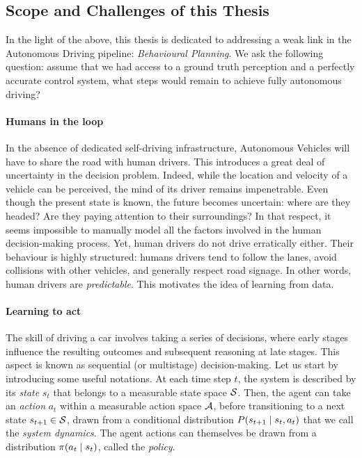 \subsection{Scope and Challenges of this Thesis}
\label{sec:scopes-and-challenges}

In the light of the above, this thesis is dedicated to addressing a weak link in the Autonomous Driving pipeline: \emph{Behavioural Planning}.  We ask the following question: assume that we had access to a ground truth perception and a perfectly accurate control system, what steps would remain to achieve fully autonomous driving?


\paragraph{Humans in the loop}

In the absence of dedicated self-driving infrastructure, Autonomous Vehicles will have to share the road with human drivers. This introduces a great deal of uncertainty in the decision problem. Indeed, while the location and velocity of a vehicle can be perceived, the mind of its driver remains impenetrable. Even though the present state is known, the future becomes uncertain: where are they headed? Are they paying attention to their surroundings? In that respect, it seems impossible to manually model all the factors involved in the human decision-making process. Yet, human drivers do not drive erratically either. Their behaviour is highly structured: humans drivers tend to follow the lanes, avoid collisions with other vehicles, and generally respect road signage. In other words, human drivers are \emph{predictable}. This motivates the idea of learning from data.%

\paragraph{Learning to act}

The skill of driving a car involves taking a series of decisions, where early stages influence the resulting outcomes and subsequent reasoning at late stages. This aspect is known as sequential (or multistage) decision-making. Let us start by introducing some useful notations. At each time step $t$, the system is described by its \emph{state} $s_t$ that belongs to a measurable state space $\mathcal{S}$. Then, the agent can take an \emph{action} $a_t$ within a measurable action space $\mathcal{A}$, before transitioning to a next state $s_{t+1}\in\mathcal{S}$, drawn from a conditional distribution $P\lparen s_{t+1} \mid s_t, a_t\rparen$ that we call the \emph{system dynamics}. The agent actions can themselves be drawn from a distribution $\pi\lparen a_t\mid s_t\rparen$, called the \emph{policy}.

